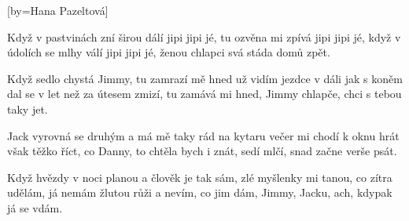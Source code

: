 [by={Hana Pazeltová}]

\beginchorus{}
Když v pastvinách zní širou dálí jipi jipi jé,
tu ozvěna mi zpívá jipi jipi jé,
když v údolích se mlhy válí jipi jipi jé,
ženou chlapci svá stáda domů zpět.
\endchorus{}

\beginverse{}
Když sedlo chystá Jimmy, tu zamrazí mě hned
už vidím jezdce v dáli jak s koněm dal se v let
než za útesem zmizí, tu zamává mi hned,
Jimmy chlapče, chci s tebou taky jet.
\endverse{}

\beginchorus{}
\phantom{}
\endchorus{}

\beginverse{}
Jack vyrovná se druhým a má mě taky rád
na kytaru večer mi chodí k oknu hrát
však těžko říct, co Danny, to chtěla bych i znát,
sedí mlčí, snad začne verše psát.
\endverse{}

\beginchorus{}
\phantom{}
\endchorus{}

\beginverse{}
Když hvězdy v noci planou a člověk je tak sám,
zlé myšlenky mi tanou, co zítra udělám,
já nemám žlutou růži a nevím, co jim dám,
\lrep{} Jimmy, Jacku, ach, kdypak já se vdám. \rrep{}
\endverse{}

\endsong{}
